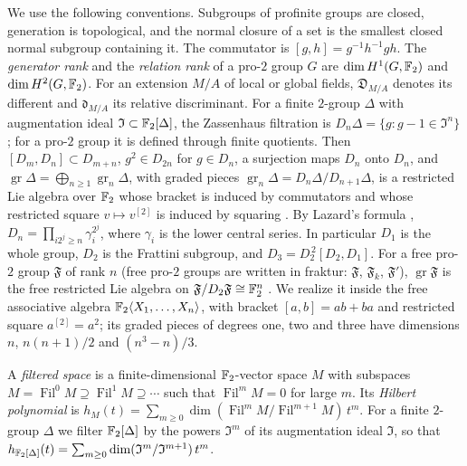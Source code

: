 We use the following conventions. Subgroups of profinite groups are closed,
generation is topological, and the normal closure of a set is the smallest
closed normal subgroup containing it. The commutator is
$[g,h]=g^{-1}h^{-1}gh$. The \emph{generator rank} and the \emph{relation
rank} of a pro-$2$ group $G$ are $\dim H^1(G,\mathbb F_2)$ and $\dim H^2(G,\mathbb F_2)$.
For an extension $M/A$ of local or global fields, $\mathfrak D_{M/A}$ denotes
its different and $\mathfrak d_{M/A}$ its relative discriminant. For a finite
$2$-group $\Delta$ with augmentation
ideal $\mathfrak I\subset\mathbb F_2[\Delta]$, the Zassenhaus filtration is
$D_n\Delta=\{g:g-1\in\mathfrak I^n\}$; for a pro-$2$ group it is defined
through finite quotients. Then $[D_m,D_n]\subset D_{m+n}$, $g^2\in D_{2n}$
for $g\in D_n$, a surjection maps $D_n$ onto $D_n$, and
$\operatorname{gr}\Delta=\bigoplus_{n\ge1}\operatorname{gr}_n\Delta$, with
graded pieces $\operatorname{gr}_n\Delta=D_n\Delta/D_{n+1}\Delta$, is a
restricted Lie algebra over $\mathbb F_2$ whose bracket is induced by commutators
and whose restricted square $v\mapsto v^{[2]}$ is induced by squaring
\cite{Jennings,Quillen,Ershov2012}. By Lazard's formula
\cite[Proposition~3.2]{Ershov2012}, $D_n=\prod_{i2^j\ge n}\gamma_i^{2^j}$,
where $\gamma_i$ is the lower central series. In particular $D_1$ is the
whole group, $D_2$ is the Frattini subgroup, and $D_3=D_2^{\,2}[D_2,D_1]$. For
a free pro-$2$ group $\mathfrak F$ of rank $n$ (free pro-$2$ groups are
written in fraktur: $\mathfrak F$, $\mathfrak F_k$, $\mathfrak F'$),
$\operatorname{gr}\mathfrak F$ is the free restricted Lie algebra on $\mathfrak F/D_2\mathfrak F\cong\mathbb F_2^n$
\cite{Quillen,Ershov2012}. We realize it inside the free associative
algebra $\mathbb F_2\langle X_1,\dots,X_n\rangle$, with bracket $[a,b]=ab+ba$ and
restricted square $a^{[2]}=a^2$; its graded pieces of degrees one, two and
three have dimensions $n$, $n(n+1)/2$ and $(n^3-n)/3$.

\begin{definition}\label{tw:hilbert-def}
A \emph{filtered space} is a finite-dimensional $\mathbb F_2$-vector space $M$
with subspaces
$M=\operatorname{Fil}^0M\supseteq\operatorname{Fil}^1M\supseteq\cdots$ such
that $\operatorname{Fil}^mM=0$ for large $m$. Its \emph{Hilbert polynomial}
is
$h_M(t)=\sum_{m\ge0}\dim(\operatorname{Fil}^mM/\operatorname{Fil}^{m+1}M)\,t^m$.
For a finite $2$-group $\Delta$ we filter $\mathbb F_2[\Delta]$ by the powers
$\mathfrak I^m$ of its augmentation ideal $\mathfrak I$, so that
$h_{\mathbb F_2[\Delta]}(t)=\sum_{m\ge0}\dim(\mathfrak I^m/\mathfrak I^{m+1})\,t^m$.
\end{definition}

